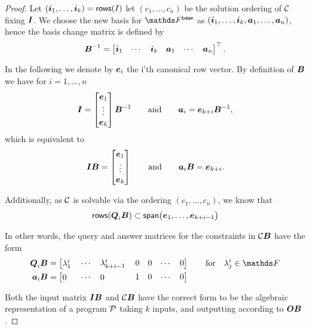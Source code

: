 \begin{proof}
Let $(\vi_1, \dots, \vi_k) = \rows(I)$ let $(c_1, \dots, c_n)$ be the solution ordering of $\C$ fixing $\I$.
We choose the new basis for $\Base$ as $(\vi_1, \dots, \vi_k, \va_1, \dots, \va_n)$, hence the basis change matrix is defined by
\[
    \B^{-1} = 
    \begin{bmatrix}
\vi_1 &
\cdots &
\vi_k &
\va_1 &
\cdots &
\va_n
    \end{bmatrix}^\top.
\]

In the following we denote by $\v e_i$ the i'th canonical row vector.
By definition of $\B$ we have for $i=1, \dots, n$
\begin{equation*}
\I = \begin{bmatrix}
    \v e_1 \\
    \vdots \\
    \v e_k
\end{bmatrix} \B^{-1}
\qquad \textrm{and} \qquad
\va_i = \v e_{k+i} \B^{-1},
\end{equation*}
which is equivalent to
\begin{equation*}
\I \B = \begin{bmatrix}
    \v e_1 \\
    \vdots \\
    \v e_k
\end{bmatrix}
\qquad \textrm{and} \qquad
\va_i \B = \v e_{k+i}.
\end{equation*}

Additionally, as $\C$ is solvable via the ordering $(c_1, \dots, c_n)$,
we know that 
\[
\rows(\Q_i \B) \subset \spn\big( \ve_1, \dots, \ve_{k+i-1} \big)
\]

In other words, the query and answer matrices for the constraints in $\C \B$ have the form
\begin{align*}
\Q_i \B &= \begin{bmatrix} \parbox{12pt}{$\lambda^i_1$} & \cdots & \parbox{32pt}{$\lambda^i_{k+i-1}$} & 0 & 0 & \cdots & 0 \end{bmatrix} \qquad \textrm{for} \quad \lambda^i_j \in \F \\
\va_i \B&= \begin{bmatrix} \parbox{12pt}{0}             & \cdots & \parbox{32pt}{0}                 & 1 & 0 & \cdots & 0 \end{bmatrix}
\end{align*}

Both the input matrix $\I \B$ and $\C \B$ have the correct form to be 
the algebraic representation of a program $\P$ taking $k$ inputs,
and outputting according to $\O \B$.
\end{proof}

